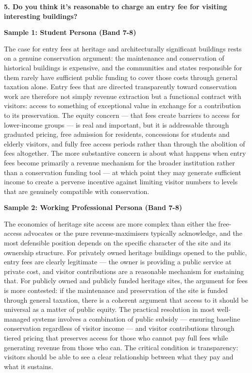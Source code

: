 \separator

\begin{ieltsquestion}
\textbf{5. Do you think it's reasonable to charge an entry fee for visiting interesting buildings?}
\end{ieltsquestion}
\textbf{Sample 1: Student Persona (Band 7-8)}

The case for entry fees at heritage and architecturally significant buildings rests on a genuine conservation argument: the maintenance and conservation of historical buildings is expensive, and the communities and states responsible for them rarely have sufficient public funding to cover those costs through general taxation alone. Entry fees that are directed transparently toward conservation work are therefore not simply revenue extraction but a functional contract with visitors: access to something of exceptional value in exchange for a contribution to its preservation. The equity concern — that fees create barriers to access for lower-income groups — is real and important, but it is addressable through graduated pricing, free admission for residents, concessions for students and elderly visitors, and fully free access periods rather than through the abolition of fees altogether. The more substantive concern is about what happens when entry fees become primarily a revenue mechanism for the broader institution rather than a conservation funding tool — at which point they may generate sufficient income to create a perverse incentive against limiting visitor numbers to levels that are genuinely compatible with conservation.

\textbf{Sample 2: Working Professional Persona (Band 7-8)}

The economics of heritage site access are more complex than either the free-access advocates or the pure revenue-maximisers typically acknowledge, and the most defensible position depends on the specific character of the site and its ownership structure. For privately owned heritage buildings opened to the public, entry fees are clearly legitimate — the owner is providing a public service at private cost, and visitor contributions are a reasonable mechanism for sustaining that. For publicly owned and publicly funded heritage sites, the argument for fees is more contested: if the maintenance and preservation of the site is funded through general taxation, there is a coherent argument that access to it should be universal as a matter of public equity. The practical resolution in most well-managed systems involves a combination of public subsidy — ensuring baseline conservation regardless of visitor income — and visitor contributions through tiered pricing that preserves access for those who cannot pay full fees while generating revenue from those who can. The critical condition is transparency: visitors should be able to see a clear relationship between what they pay and what it sustains.


